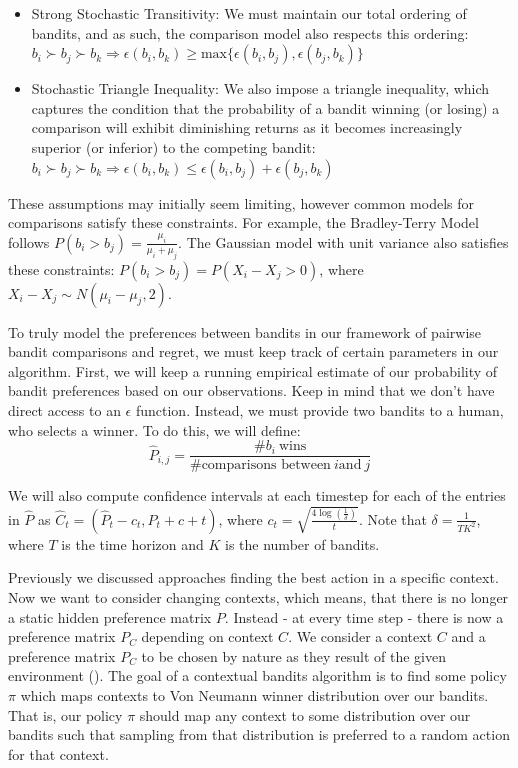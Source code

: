\documentclass[
  letterpaper,
  DIV=11,
  numbers=noendperiod,
  oneside]{scrreprt}
\theoremstyle{remark}
\begin{document}
\begin{itemize}
\item
  Strong Stochastic Transitivity: We must maintain our total ordering of
  bandits, and as such, the comparison model also respects this
  ordering:
  \(b_i \succ b_j \succ b_k \Rightarrow \epsilon(b_i, b_k) \ge \text{max}\{\epsilon(b_i, b_j), \epsilon(b_j, b_k)\}\)
\item
  Stochastic Triangle Inequality: We also impose a triangle inequality,
  which captures the condition that the probability of a bandit winning
  (or losing) a comparison will exhibit diminishing returns as it
  becomes increasingly superior (or inferior) to the competing bandit:
  \(b_i \succ b_j \succ b_k \Rightarrow \epsilon(b_i, b_k) \le \epsilon(b_i, b_j) + \epsilon(b_j, b_k)\)
\end{itemize}

These assumptions may initially seem limiting, however common models for
comparisons satisfy these constraints. For example, the Bradley-Terry
Model follows \(P(b_i > b_j) = \frac{\mu_i}{\mu_i + \mu_j}\). The
Gaussian model with unit variance also satisfies these constraints:
\(P(b_i > b_j) = P(X_i - X_j > 0)\), where
\(X_i - X_j \sim N(\mu_i - \mu_j, 2)\).

To truly model the preferences between bandits in our framework of
pairwise bandit comparisons and regret, we must keep track of certain
parameters in our algorithm. First, we will keep a running empirical
estimate of our probability of bandit preferences based on our
observations. Keep in mind that we don't have direct access to an
\(\epsilon\) function. Instead, we must provide two bandits to a human,
who selects a winner. To do this, we will define:
\[\hat{P}_{i, j} = \frac{\# b_i\ \text{wins}}{\# \text{comparisons between}\ i \text{and}\ j}\]

We will also compute confidence intervals at each timestep for each of
the entries in \(\hat{P}\) as
\(\hat{C}_t = \left( \hat{P}_t - c_t, \hat{P}_t + c+t \right)\), where
\(c_t = \sqrt{\frac{4\log(\frac{1}{\delta})}{t}}\). Note that
\(\delta = \frac{1}{TK^2}\), where \(T\) is the time horizon and \(K\)
is the number of bandits.

Previously we discussed approaches finding the best action in a specific
context. Now we want to consider changing contexts, which means, that
there is no longer a static hidden preference matrix \(P\). Instead - at
every time step - there is now a preference matrix \(P_C\) depending on
context \(C\). We consider a context \(C\) and a preference matrix
\(P_C\) to be chosen by nature as they result of the given environment
(). The goal of a
contextual bandits algorithm is to find some policy \(\pi\) which maps
contexts to Von Neumann winner distribution over our bandits. That is,
our policy \(\pi\) should map any context to some distribution over our
bandits such that sampling from that distribution is preferred to a
random action for that context.
\end{document}
